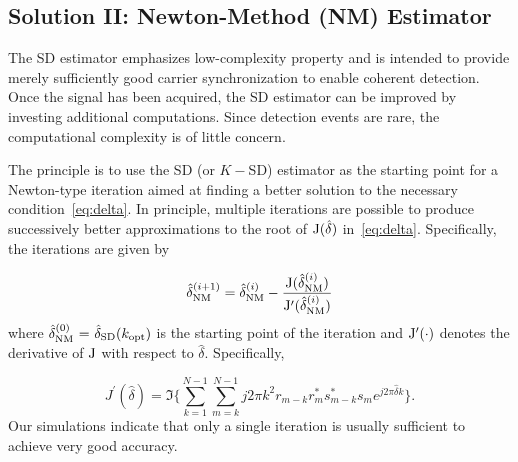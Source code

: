 
\subsection{Solution II: Newton-Method (NM) Estimator}

The SD estimator emphasizes low-complexity property and is intended to provide merely sufficiently good carrier synchronization
to enable coherent detection. Once the signal has been acquired, the SD estimator can be improved by 
investing additional computations. Since detection events are rare, the computational complexity is of little concern.

The principle is to use the SD (or $K-$SD) estimator as the starting point for a Newton-type iteration 
aimed at finding a better solution to the necessary condition~\eqref{eq:delta}. 
In principle, multiple iterations are possible to produce successively better approximations to the root of
$\mathrm{J}(\hat{\delta})$ in~\eqref{eq:delta}. Specifically, the iterations are given by

\begin{equation}
    \label{eq:iter_NM_est}
    \hat{\delta}_{\text{NM}}^{(i+1)}=\hat{\delta}_{\text{NM}}^{(i)}-
    \frac{\mathrm{J}(\hat{\delta}_{\text{NM}}^{(i)})}{\mathrm{J}^\prime(\hat{\delta}_{\text{NM}}^{(i)})}
  \end{equation}
where $\hat{\delta}_{\text{NM}}^{(0)}~{=}~\hat{\delta}_{\text{SD}}(k_{\text{opt}})$ is the starting point of the iteration and
$\mathrm{J}^\prime(\cdot)$ denotes the derivative of $\mathrm{J}$ with respect to $\hat{\delta}$. Specifically,

\begin{equation}
    \label{eq:derivative of delta}
    J^\prime(\hat{\delta}) = \Im\bigg\{\sum_{k=1}^{N-1}{\sum_{m=k}^{N-1}{j2\pi k^2r_{m-k}r_m^{*}s_{m-k}^{*}s_m}e^{j2\pi\hat{\delta}k}}\bigg\}.
    \end{equation}
Our simulations indicate that only a single iteration is usually sufficient to achieve very good accuracy.


